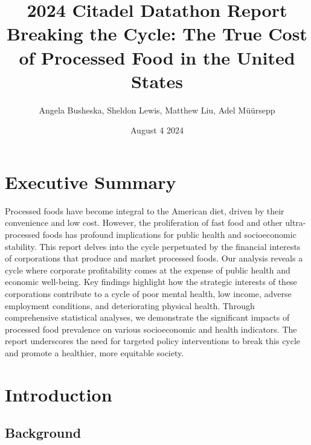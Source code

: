 \documentclass[letterpaper, 11pt]{report}
\title{\LARGE 2024 Citadel Datathon Report\\[0.5\baselineskip]
\large Breaking the Cycle: The True Cost of Processed Food in the United States}
\author{\large Angela Busheska, Sheldon Lewis, Matthew Liu, Adel Müürsepp}
\date{\normalsize August 4 2024}
\begin{document}
\maketitle


\renewcommand{\contentsname}{Table of Contents}
\tableofcontents

\newpage
\onehalfspacing
\setcounter{page}{1}

\section{Executive Summary}


Processed foods have become integral to the American diet, driven by their convenience and low cost. However, the proliferation of fast food and other ultra-processed foods has profound implications for public health and socioeconomic stability. This report delves into the cycle perpetuated by the financial interests of corporations that produce and market processed foods. Our analysis reveals a cycle where corporate profitability comes at the expense of public health and economic well-being. Key findings highlight how the strategic interests of these corporations contribute to a cycle of poor mental health, low income, adverse employment conditions, and deteriorating physical health. Through comprehensive statistical analyses, we demonstrate the significant impacts of processed food prevalence on various socioeconomic and health indicators. The report underscores the need for targeted policy interventions to break this cycle and promote a healthier, more equitable society.

\section{Introduction}

\subsection{Background}

\end{document}

